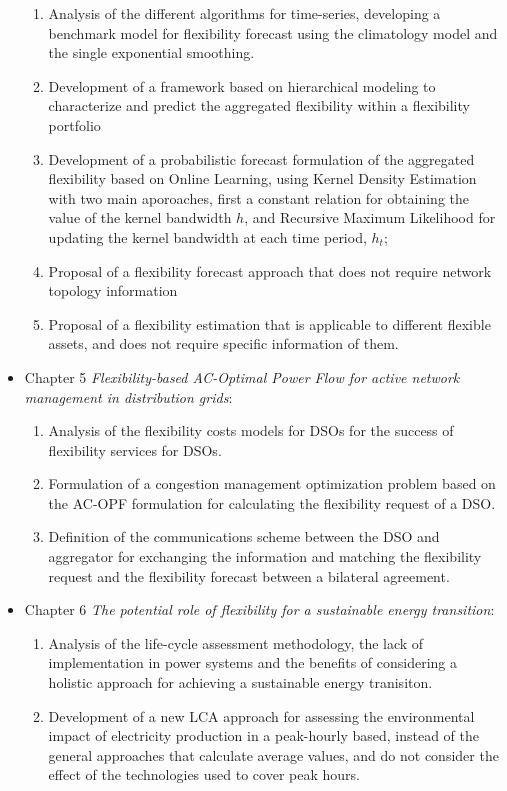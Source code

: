 \begin{itemize}
\begin{enumerate}
		\item Analysis of the different algorithms for time-series, developing a benchmark model for flexibility forecast using the climatology model and the single exponential smoothing. 
		\item Development of a framework based on hierarchical modeling to characterize and predict the aggregated flexibility within a flexibility portfolio
		\item Development  of a probabilistic forecast formulation of the aggregated flexibility based on Online Learning, using Kernel Density Estimation with two main aporoaches, first a constant relation for obtaining the value of the kernel bandwidth $h$, and Recursive Maximum Likelihood for updating the kernel bandwidth at each time period, $h_t$;
		\item Proposal of a flexibility forecast approach that does not require network topology information
		\item Proposal of a flexibility estimation that is applicable to different flexible assets, and does not require specific information of them. 
	\end{enumerate}
\item Chapter 5 \textit{Flexibility-based AC-Optimal Power Flow for active network management in distribution grids}: 
	\begin{enumerate}
		\item Analysis of the flexibility costs models for DSOs for the success of flexibility services for DSOs. 
		\item Formulation of a congestion management optimization problem based on the AC-OPF formulation for calculating the flexibility request of a DSO.
		\item Definition of the communications scheme between the DSO and aggregator for exchanging the information and matching the flexibility request and the flexibility forecast between a bilateral agreement.
	\end{enumerate}
\item Chapter 6 \textit{The potential role of flexibility for a sustainable energy transition}: 
	\begin{enumerate}
		\item Analysis of the life-cycle assessment methodology, the lack of implementation in power systems and the benefits of considering a holistic approach for achieving a sustainable energy tranisiton. 
		\item Development of a new LCA approach for assessing the environmental impact of electricity production in a peak-hourly based, instead of the general approaches that calculate average values, and do not consider the effect of the technologies used to cover peak hours. 

\end{enumerate}
\end{itemize}
